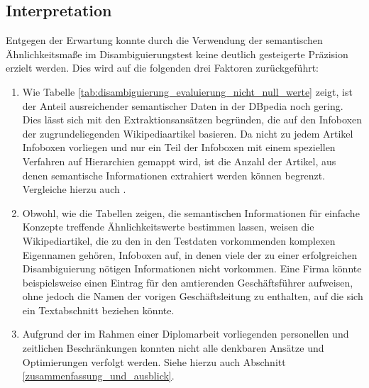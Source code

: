 \subsection{Interpretation}
Entgegen der Erwartung konnte durch die Verwendung der semantischen Ähnlichkeitsmaße im Disambiguierungstest keine deutlich gesteigerte Präzision erzielt werden.
Dies wird auf die folgenden drei Faktoren zurückgeführt:
\begin{enumerate}
 \item Wie Tabelle \ref{tab:disambiguierung_evaluierung_nicht_null_werte} zeigt, ist der Anteil ausreichender semantischer Daten in der DBpedia noch gering.
Dies lässt sich mit den Extraktionsansätzen begründen, die auf den Infoboxen der zugrundeliegenden Wikipediaartikel basieren. Da nicht zu jedem Artikel Infoboxen vorliegen
und nur ein Teil der Infoboxen mit einem speziellen Verfahren auf Hierarchien gemappt wird, ist die Anzahl der Artikel, aus denen semantische Informationen extrahiert werden können begrenzt.
Vergleiche hierzu auch \citet{dbpedia}.
 \item Obwohl, wie die Tabellen  zeigen, die semantischen Informationen für einfache Konzepte treffende Ähnlichkeitswerte bestimmen lassen, weisen die Wikipediartikel, die zu den in den Testdaten vorkommenden
komplexen Eigennamen gehören, Infoboxen auf, in denen viele der zu einer erfolgreichen Disambiguierung nötigen Informationen nicht vorkommen.
Eine Firma könnte beispielsweise einen Eintrag für den amtierenden Geschäftsführer aufweisen, ohne jedoch die Namen der vorigen Geschäftsleitung zu enthalten, auf die sich ein Textabschnitt beziehen könnte.
 \item Aufgrund der im Rahmen einer Diplomarbeit vorliegenden personellen und zeitlichen Beschränkungen konnten nicht alle denkbaren Ansätze und Optimierungen verfolgt werden. Siehe hierzu auch Abschnitt \ref{zusammenfassung_und_ausblick}.
\end{enumerate}


\iffalse
